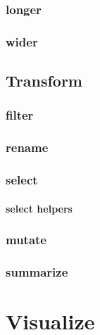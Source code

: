 \documentclass[
  12pt,
]{book}
\begin{document}
\hypertarget{longer}{%
\section{longer}\label{longer}}

\hypertarget{wider}{%
\section{wider}\label{wider}}

\hypertarget{transform-1}{%
\chapter{Transform}\label{transform-1}}

\hypertarget{filter}{%
\section{filter}\label{filter}}

\hypertarget{rename}{%
\section{rename}\label{rename}}

\hypertarget{select}{%
\section{select}\label{select}}

\hypertarget{select-helpers}{%
\subsection{select helpers}\label{select-helpers}}

\hypertarget{mutate}{%
\section{mutate}\label{mutate}}

\hypertarget{summarize}{%
\section{summarize}\label{summarize}}

\hypertarget{part-visualize}{%
\part{Visualize}\label{part-visualize}}
\end{document}

